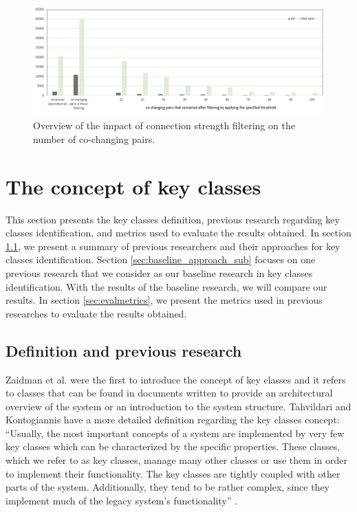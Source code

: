\documentclass[runningheads]{comsis2}
\begin{document}
\begin{figure}
\centering
\includegraphics[width=\textwidth]{strength_overview.PNG}
\caption{Overview of the impact of connection strength filtering on the number of co-changing pairs. }
\label{fig:strength_overview}
\centering
\end{figure}

\section{The concept of key classes}
\label{sec:baseline_approach}

This section presents the key classes definition, previous research regarding key classes identification, and metrics used to evaluate the results obtained.
In section \ref{sec:keyclass_definition}, we present a summary of previous researchers and their approaches for key classes identification. Section \ref{sec:baseline_approach_sub} focuses on one previous research that we consider as our baseline research in key classes identification. With the results of the baseline research, we will compare our results. 
In section \ref{sec:evalmetrics}, we present the metrics used in previous researches to evaluate the results obtained. 

\subsection{Definition and previous research}
\label{sec:keyclass_definition}

Zaidman et al. \cite{ZaidmanJurnal} were the first to introduce the concept of key classes and it refers to classes that can be found in documents written to provide an architectural overview of the system or an introduction to the system structure.
Tahvildari and Kontogiannis have a more detailed definition regarding the key classes concept: “Usually, the most important concepts of a system are implemented by very few key classes which can be characterized by the specific properties. These classes, which we refer to as key classes, manage many other classes or use them in order to implement their functionality. The key classes are tightly coupled with other parts of the system. Additionally, they tend to be rather complex, since they implement much of the legacy system’s functionality” \cite{Tahvildari2004ImprovingDQ}.
\end{document}
